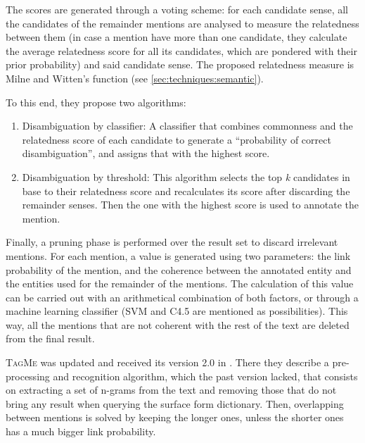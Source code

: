 The scores are generated through a voting scheme: for each candidate sense, all the candidates of the remainder mentions are analysed to measure the relatedness between them (in case a mention have more than one candidate, they calculate the average relatedness score for all its candidates, which are pondered with their prior probability) and said candidate sense. The proposed relatedness measure is Milne and Witten's function (see \autoref{sec:techniques:semantic}).
\begin{comment}
, the formula being:
%
\begin{equation}
\mathrm{vote}_b(p_a) = \frac{\sum_{p_b \in P_g(b)}{} rel(p_b,p_a)\cdot P_r(p_b|b)}{|P_g(b)|}
\end{equation}
\end{comment}

To this end, they propose two algorithms:
%
\begin{enumerate}
	\item Disambiguation by classifier: A classifier that combines commonness and the relatedness score of each candidate to generate a ``probability of correct disambiguation'', and assigns that with the highest score.
	\item Disambiguation by threshold: This algorithm selects the top \textit{k} candidates in base to their relatedness score and recalculates its score after discarding the remainder senses. Then the one with the highest score is used to annotate the mention.
\end{enumerate}

Finally, a pruning phase is performed over the result set to discard irrelevant mentions. For each mention, a value is generated using two parameters: the link probability of the mention, and the coherence between the annotated entity and the entities used for the remainder of the mentions. The calculation of this value can be carried out with an arithmetical combination of both factors, or through a machine learning classifier (SVM and C4.5 are mentioned as possibilities). This way, all the mentions that are not coherent with the rest of the text are deleted from the final result.

\textsc{TagMe} was updated and received its version 2.0 in \cite{ferragina2012}. There they describe a pre-processing and recognition algorithm, which the past version lacked, that consists on extracting a set of n-grams from the text and removing those that do not bring any result when querying the surface form dictionary. Then, overlapping between mentions is solved by keeping the longer ones, unless the shorter ones has a much bigger link probability. 

